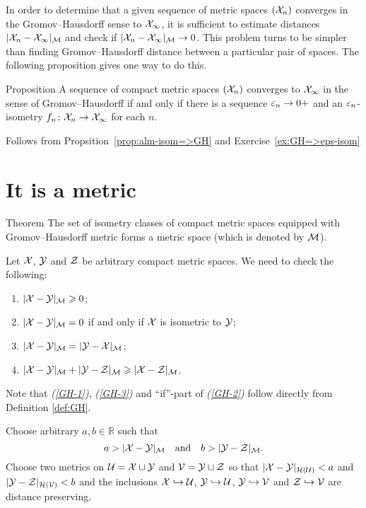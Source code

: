 In order to determine that a given sequence of metric spaces $(\mathcal{X}_n)$ converges in the Gromov--Hausdorff sense to $\mathcal{X}_\infty$, it is sufficient to estimate distances $|\mathcal{X}_n-\mathcal{X}_\infty|_{\mathcal{M}}$ and  check if $|\mathcal{X}_n-\mathcal{X}_\infty|_{\mathcal{M}}\to 0$.
This problem turns to be simpler than finding Gromov--Hausdorff distance between a particular pair of spaces.
The following proposition gives one way to do this.

\begin{thm}{Proposition}\label{prop:GH-e-isom}
A sequence of compact metric spaces $(\mathcal{X}_n)$ converges to  $\mathcal{X}_\infty$ in the sense of Gromov--Hausdorff if and only if there is a sequence $\varepsilon_n\to0+$
and an $\varepsilon_n$-isometry $f_n\colon\mathcal{X}_n\to \mathcal{X}_\infty$ for each $n$.
\end{thm}

 Follows from Propsition~\ref{prop:alm-isom=>GH} and Exercise~\ref{ex:GH=>eps-isom}
\qeds

\section{It is a metric}

\begin{thm}{Theorem}\label{thm:GH-is-a-metric}
The set of isometry classes of compact metric spaces equipped with Gromov--Hausdorff metric forms a metric space (which is denoted by $\mathcal{M}$).
\end{thm}

Let $\mathcal{X}$, $\mathcal{Y}$ and $\mathcal{Z}$ be arbitrary  compact metric spaces.
We need to check the following:
\begin{enumerate}[{\it (i)}]
\item\label{GH-1} $|\mathcal{X}-\mathcal{Y}|_{\mathcal{M}}\geqslant 0$;
\item\label{GH-2} $|\mathcal{X}-\mathcal{Y}|_{\mathcal{M}}=0$ if and only if $\mathcal{X}$ is isometric to $\mathcal{Y}$;
\item\label{GH-3} $|\mathcal{X}-\mathcal{Y}|_{\mathcal{M}}=|\mathcal{Y}-\mathcal{X}|_{\mathcal{M}}$;
\item\label{GH-4} $|\mathcal{X}-\mathcal{Y}|_{\mathcal{M}}+|\mathcal{Y}-\mathcal{Z}|_{\mathcal{M}}\geqslant |\mathcal{X}-\mathcal{Z}|_{\mathcal{M}}$.
\end{enumerate}


Note that {\it (\ref{GH-1})}, {\it(\ref{GH-3})} and ``if''-part of {\it(\ref{GH-2})} follow directly from Definition \ref{def:GH}.

Choose arbitrary $a,b \in \mathbb{R}$ such that
$$a>|\mathcal{X}-\mathcal{Y}|_{\mathcal{M}}
\quad\text{and}\quad
b>|\mathcal{Y}-\mathcal{Z}|_{\mathcal{M}}.$$
Choose two metrics on $\mathcal{U}=\mathcal{X}\sqcup \mathcal{Y}$ and $\mathcal{V}=\mathcal{Y}\sqcup \mathcal{Z}$ so that
$|\mathcal{X}-\mathcal{Y}|_{\mathcal{H}(\mathcal{U})}<a$ and $|\mathcal{Y}-\mathcal{Z}|_{\mathcal{H}(\mathcal{V})}<b$ 
and the inclusions $\mathcal{X}\hookrightarrow \mathcal{U}$, $\mathcal{Y}\hookrightarrow \mathcal{U}$, $\mathcal{Y}\hookrightarrow \mathcal{V}$ and $\mathcal{Z}\hookrightarrow \mathcal{V}$ are distance preserving.

